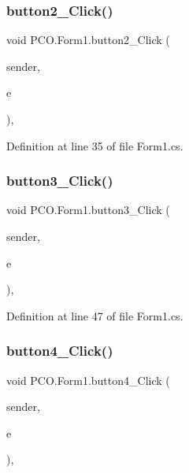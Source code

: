 \subsubsection{\texorpdfstring{button2\+\_\+\+Click()}{button2\_Click()}}
{\footnotesize\ttfamily void P\+C\+O.\+Form1.\+button2\+\_\+\+Click (\begin{DoxyParamCaption}\item[{object}]{sender,  }\item[{Event\+Args}]{e }\end{DoxyParamCaption})\hspace{0.3cm}{\ttfamily [inline]}, {\ttfamily [private]}}



Definition at line 35 of file Form1.\+cs.

\mbox{\label{classPCO_1_1Form1_af21547a5b70c700dc8e2371ba8edab83}} 
\subsubsection{\texorpdfstring{button3\+\_\+\+Click()}{button3\_Click()}}
{\footnotesize\ttfamily void P\+C\+O.\+Form1.\+button3\+\_\+\+Click (\begin{DoxyParamCaption}\item[{object}]{sender,  }\item[{Event\+Args}]{e }\end{DoxyParamCaption})\hspace{0.3cm}{\ttfamily [inline]}, {\ttfamily [private]}}



Definition at line 47 of file Form1.\+cs.

\mbox{\label{classPCO_1_1Form1_a2a20f866766583f149e6a8c1d8575c20}} 
\subsubsection{\texorpdfstring{button4\+\_\+\+Click()}{button4\_Click()}}
{\footnotesize\ttfamily void P\+C\+O.\+Form1.\+button4\+\_\+\+Click (\begin{DoxyParamCaption}\item[{object}]{sender,  }\item[{Event\+Args}]{e }\end{DoxyParamCaption})\hspace{0.3cm}{\ttfamily [inline]}, {\ttfamily [private]}}



